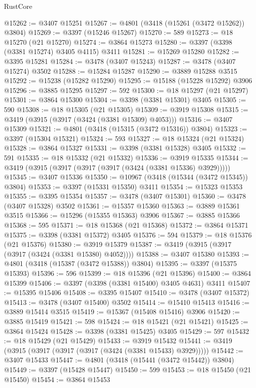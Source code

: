 \begin{lexlean}{RustCore}
\begin{coremodule}
@15262 := @3407 @15251
@15267 := @4801 (@3418 (@15261 (@3472 @15262)) @3804)
@15269 := @3397 (@15246 @15267)
@15270 := 589
@15273 := @18 @15270 (@21 @15270)
@15274 := @3864 @15273
@15280 := @3397 (@3398 (@3381 @15274) @3405 @4115) @3411
@15281 := @15269 @15280
@15282 := @3395 @15281
@15284 := @3478 (@3407 @15243)
@15287 := @3478 (@3407 @15274) @3502
@15288 := @15284 @15287
@15290 := @3889 @15288 @3515
@15292 := @15238 (@15282 @15290)
@15295 := @15188 (@15228 @15292) @3906
@15296 := @3885 @15295
@15297 := 592
@15300 := @18 @15297 (@21 @15297)
@15301 := @3864 @15300
@15304 := @3398 (@3381 @15301) @3405
@15305 := 590
@15308 := @18 @15305 (@21 @15305)
@15309 := @3919 @15308
@15315 := @3419 (@3915 (@3917 (@3424 (@3381 @15309) @4053)))
@15316 := @3407 @15309
@15321 := @4801 (@3418 (@15315 (@3472 @15316)) @3804)
@15323 := @3397 (@15304 @15321)
@15324 := 593
@15327 := @18 @15324 (@21 @15324)
@15328 := @3864 @15327
@15331 := @3398 (@3381 @15328) @3405
@15332 := 591
@15335 := @18 @15332 (@21 @15332)
@15336 := @3919 @15335
@15344 := @3419 (@3915 (@3917 (@3917 (@3917 (@3424 (@3381 @15336) @3929)))))
@15345 := @3407 @15336
@15350 := @10967 (@3418 (@15344 (@3472 @15345)) @3804)
@15353 := @3397 (@15331 @15350) @3411
@15354 := @15323 @15353
@15355 := @3395 @15354
@15357 := @3478 (@3407 @15301)
@15360 := @3478 (@3407 @15328) @3502
@15361 := @15357 @15360
@15363 := @3889 @15361 @3515
@15366 := @15296 (@15355 @15363) @3906
@15367 := @3885 @15366
@15368 := 595
@15371 := @18 @15368 (@21 @15368)
@15372 := @3864 @15371
@15375 := @3398 (@3381 @15372) @3405
@15376 := 594
@15379 := @18 @15376 (@21 @15376)
@15380 := @3919 @15379
@15387 := @3419 (@3915 (@3917 (@3917 (@3424 (@3381 @15380) @4052))))
@15388 := @3407 @15380
@15393 := @4801 (@3418 (@15387 (@3472 @15388)) @3804)
@15395 := @3397 (@15375 @15393)
@15396 := 596
@15399 := @18 @15396 (@21 @15396)
@15400 := @3864 @15399
@15406 := @3397 (@3398 (@3381 @15400) @3405 @4631) @3411
@15407 := @15395 @15406
@15408 := @3395 @15407
@15410 := @3478 (@3407 @15372)
@15413 := @3478 (@3407 @15400) @3502
@15414 := @15410 @15413
@15416 := @3889 @15414 @3515
@15419 := @15367 (@15408 @15416) @3906
@15420 := @3885 @15419
@15421 := 598
@15424 := @18 @15421 (@21 @15421)
@15425 := @3864 @15424
@15428 := @3398 (@3381 @15425) @3405
@15429 := 597
@15432 := @18 @15429 (@21 @15429)
@15433 := @3919 @15432
@15441 := @3419 (@3915 (@3917 (@3917 (@3917 (@3424 (@3381 @15433) @3929)))))
@15442 := @3407 @15433
@15447 := @4801 (@3418 (@15441 (@3472 @15442)) @3804)
@15449 := @3397 (@15428 @15447)
@15450 := 599
@15453 := @18 @15450 (@21 @15450)
@15454 := @3864 @15453

\end{coremodule}
\end{lexlean}

